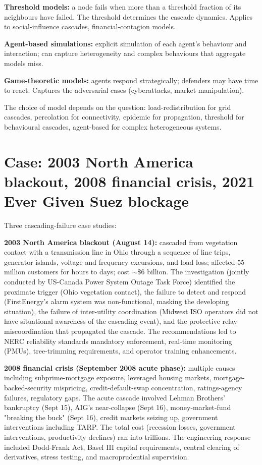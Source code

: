 \textbf{Threshold models:} a node fails when more than a threshold fraction of its neighbours have failed. The threshold determines the cascade dynamics. Applies to social-influence cascades, financial-contagion models.

\textbf{Agent-based simulations:} explicit simulation of each agent's behaviour and interaction; can capture heterogeneity and complex behaviours that aggregate models miss.

\textbf{Game-theoretic models:} agents respond strategically; defenders may have time to react. Captures the adversarial cases (cyberattacks, market manipulation).

The choice of model depends on the question: load-redistribution for grid cascades, percolation for connectivity, epidemic for propagation, threshold for behavioural cascades, agent-based for complex heterogeneous systems.

\section{Case: 2003 North America blackout, 2008 financial crisis, 2021 Ever Given Suez blockage}

Three cascading-failure case studies:

\textbf{2003 North America blackout (August 14):} cascaded from vegetation contact with a transmission line in Ohio through a sequence of line trips, generator islands, voltage and frequency excursions, and load loss; affected $55$ million customers for hours to days; cost $\sim\$6$ billion. The investigation (jointly conducted by US-Canada Power System Outage Task Force) identified the proximate trigger (Ohio vegetation contact), the failure to detect and respond (FirstEnergy's alarm system was non-functional, masking the developing situation), the failure of inter-utility coordination (Midwest ISO operators did not have situational awareness of the cascading event), and the protective relay miscoordination that propagated the cascade. The recommendations led to NERC reliability standards mandatory enforcement, real-time monitoring (PMUs), tree-trimming requirements, and operator training enhancements.

\textbf{2008 financial crisis (September 2008 acute phase):} multiple causes including subprime-mortgage exposure, leveraged housing markets, mortgage-backed-security mispricing, credit-default-swap concentration, ratings-agency failures, regulatory gaps. The acute cascade involved Lehman Brothers' bankruptcy (Sept 15), AIG's near-collapse (Sept 16), money-market-fund "breaking the buck" (Sept 16), credit markets seizing up, government interventions including TARP. The total cost (recession losses, government interventions, productivity declines) ran into trillions. The engineering response included Dodd-Frank Act, Basel III capital requirements, central clearing of derivatives, stress testing, and macroprudential supervision.

